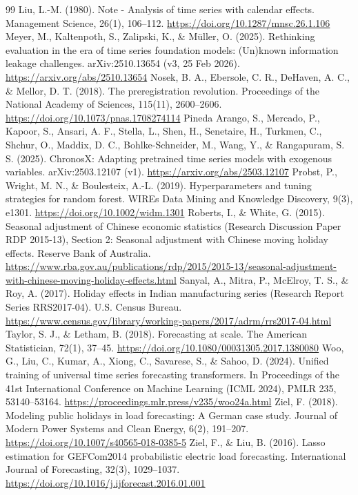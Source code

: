 \documentclass[review,12pt,authoryear]{elsarticle}
\begin{document}
\begin{thebibliography}{99}
Liu, L.-M. (1980). Note - Analysis of time series with calendar effects. Management Science, 26(1), 106–112. \url{https://doi.org/10.1287/mnsc.26.1.106}
Meyer, M., Kaltenpoth, S., Zalipski, K., \& Müller, O. (2025). Rethinking evaluation in the era of time series foundation models: (Un)known information leakage challenges. arXiv:2510.13654 (v3, 25 Feb 2026). \url{https://arxiv.org/abs/2510.13654}
Nosek, B. A., Ebersole, C. R., DeHaven, A. C., \& Mellor, D. T. (2018). The preregistration revolution. Proceedings of the National Academy of Sciences, 115(11), 2600–2606. \url{https://doi.org/10.1073/pnas.1708274114}
Pineda Arango, S., Mercado, P., Kapoor, S., Ansari, A. F., Stella, L., Shen, H., Senetaire, H., Turkmen, C., Shchur, O., Maddix, D. C., Bohlke-Schneider, M., Wang, Y., \& Rangapuram, S. S. (2025). ChronosX: Adapting pretrained time series models with exogenous variables. arXiv:2503.12107 (v1). \url{https://arxiv.org/abs/2503.12107}
Probst, P., Wright, M. N., \& Boulesteix, A.-L. (2019). Hyperparameters and tuning strategies for random forest. WIREs Data Mining and Knowledge Discovery, 9(3), e1301. \url{https://doi.org/10.1002/widm.1301}
Roberts, I., \& White, G. (2015). Seasonal adjustment of Chinese economic statistics (Research Discussion Paper RDP 2015-13), Section 2: Seasonal adjustment with Chinese moving holiday effects. Reserve Bank of Australia. \url{https://www.rba.gov.au/publications/rdp/2015/2015-13/seasonal-adjustment-with-chinese-moving-holiday-effects.html}
Sanyal, A., Mitra, P., McElroy, T. S., \& Roy, A. (2017). Holiday effects in Indian manufacturing series (Research Report Series RRS2017-04). U.S. Census Bureau. \url{https://www.census.gov/library/working-papers/2017/adrm/rrs2017-04.html}
Taylor, S. J., \& Letham, B. (2018). Forecasting at scale. The American Statistician, 72(1), 37–45. \url{https://doi.org/10.1080/00031305.2017.1380080}
Woo, G., Liu, C., Kumar, A., Xiong, C., Savarese, S., \& Sahoo, D. (2024). Unified training of universal time series forecasting transformers. In Proceedings of the 41st International Conference on Machine Learning (ICML 2024), PMLR 235, 53140–53164. \url{https://proceedings.mlr.press/v235/woo24a.html}
Ziel, F. (2018). Modeling public holidays in load forecasting: A German case study. Journal of Modern Power Systems and Clean Energy, 6(2), 191–207. \url{https://doi.org/10.1007/s40565-018-0385-5}
Ziel, F., \& Liu, B. (2016). Lasso estimation for GEFCom2014 probabilistic electric load forecasting. International Journal of Forecasting, 32(3), 1029–1037. \url{https://doi.org/10.1016/j.ijforecast.2016.01.001}
\end{thebibliography}
\endgroup
\end{document}
